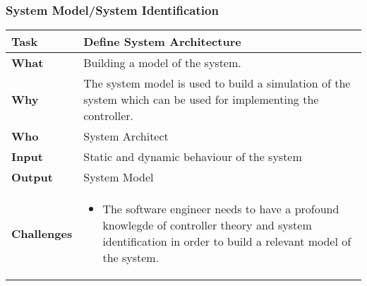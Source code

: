 \subsubsection{System Model/System Identification}
	\begin{tabularx}{\textwidth}{@{} l X @{}}
		\caption{System Model/System Identification} \label{table:ch6_Task_Controler_Tuning}\\
		\toprule 
		\bfseries Task & Define System Architecture\\
		\midrule 
		\bfseries What & Building a model of the system.\\
		\midrule 
		\bfseries Why & The system model is used to build a simulation of the system which can be used for implementing the controller.\\
		\midrule 
		\bfseries Who & System Architect\\
		\midrule 
		\bfseries Input & Static and dynamic behaviour of the system\\ 
		\midrule 
		\bfseries Output & System Model\\
		\midrule 
		\bfseries Challenges & 
		\begin{itemize}
			\item The software engineer needs to have a profound knowlegde of controller theory and system identification in order to build a relevant model of the system.
		\end{itemize}
		\\
		\bottomrule 
	\end{tabularx}


